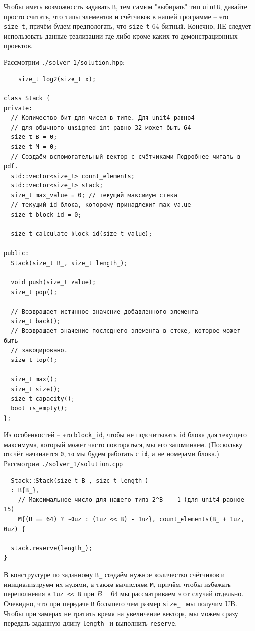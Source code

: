 Чтобы иметь возможность задавать \texttt{B}, тем самым "выбирать"{} тип \texttt{uintB}, давайте просто считать, что типы элементов и счётчиков в нашей программе -- это \texttt{size_t}, причём будем предпологать, что \texttt{size_t} 64-битный. Конечно, НЕ следует использовать данные реализации где-либо кроме каких-то демонстрационных проектов. 

Рассмотрим \texttt{./solver_1/solution.hpp}:
\begin{verbatim}
    size_t log2(size_t x);

class Stack {
private:
  // Количество бит для чисел в типе. Для unit4 равно4
  // для обычного unsigned int равно 32 может быть 64
  size_t B = 0;
  size_t M = 0;
  // Создаём вспомогательный вектор с счётчиками Подробнее читать в pdf.
  std::vector<size_t> count_elements;
  std::vector<size_t> stack;
  size_t max_value = 0; // текущий максимум стека
  // текущий id блока, которому принадлежит max_value
  size_t block_id = 0;

  size_t calculate_block_id(size_t value);

public:
  Stack(size_t B_, size_t length_);

  void push(size_t value);
  size_t pop();

  // Возвращает истинное значение добавленного элемента
  size_t back();
  // Возвращает значение последнего элемента в стеке, которое может быть
  // закодировано.
  size_t top();

  size_t max();
  size_t size();
  size_t capacity();
  bool is_empty();
};
\end{verbatim}

Из особенностей -- это \texttt{block_id}, чтобы не подсчитывать \texttt{id} блока для текущего максимума, который может часто повторяться, мы его запоминаем. (Поскольку отсчёт начинается \texttt{0}, то мы будем работать с \texttt{id}, а не номерами блока.) Рассмотрим \texttt{./solver_1/solution.cpp}
\begin{verbatim}
  Stack::Stack(size_t B_, size_t length_)
  : B{B_},
    // Максимальное число для нашего типа 2^B  - 1 (для unit4 равное 15)
    M{(B == 64) ? ~0uz : (1uz << B) - 1uz}, count_elements(B_ + 1uz, 0uz) {

  stack.reserve(length_);
}
\end{verbatim}

В конструктуре по заданному \texttt{B_} создаём нужное количество счётчиков и инициализируем их нулями, а также вычисляем \texttt{M}, причём, чтобы избежать переполнения в \texttt{1uz << B} при \(B = 64\) мы рассматриваем этот случай отдельно. Очевидно, что при передаче \texttt{B} большего чем размер \texttt{size_t} мы получим UB. Чтобы при замерах не тратить время на увеличение вектора, мы можем сразу передать заданную длину \texttt{length_} и выполнить \texttt{reserve}.

